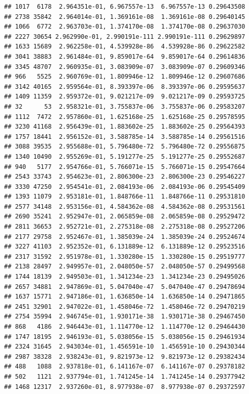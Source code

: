 \documentclass[
]{article}
\begin{document}
\begin{verbatim}
## 1017  6178  2.964351e-01, 6.967557e-13  6.967557e-13 0.29643508
## 2738 35842  2.964014e-01, 1.369161e-08  1.369161e-08 0.29640145
## 1066  6772  2.963703e-01, 1.374170e-08  1.374170e-08 0.29637030
## 2227 30654 2.962990e-01, 2.990191e-111 2.990191e-111 0.29629897
## 1633 15689  2.962258e-01, 4.539928e-86  4.539928e-86 0.29622582
## 3041 38883  2.961484e-01, 9.859017e-64  9.859017e-64 0.29614836
## 3345 48707  2.960935e-01, 3.083909e-07  3.083909e-07 0.29609346
## 966   5525  2.960769e-01, 1.809946e-12  1.809946e-12 0.29607686
## 3142 40165  2.959564e-01, 8.393397e-06  8.393397e-06 0.29595637
## 1409 11359  2.959372e-01, 9.021217e-09  9.021217e-09 0.29593725
## 32      53  2.958321e-01, 3.755837e-06  3.755837e-06 0.29583207
## 1112  7472  2.957860e-01, 1.625168e-25  1.625168e-25 0.29578595
## 3230 41168  2.956439e-01, 1.883602e-25  1.883602e-25 0.29564393
## 1757 18441  2.956152e-01, 3.588785e-14  3.588785e-14 0.29561516
## 3088 39535  2.955688e-01, 5.796480e-72  5.796480e-72 0.29556875
## 1340 10490  2.955269e-01, 5.191277e-25  5.191277e-25 0.29552687
## 940   5177  2.954766e-01, 5.766071e-15  5.766071e-15 0.29547664
## 2543 33743  2.954623e-01, 2.806300e-23  2.806300e-23 0.29546227
## 3330 47250  2.954541e-01, 2.084193e-06  2.084193e-06 0.29545409
## 1393 11079  2.953181e-01, 1.848766e-11  1.848766e-11 0.29531810
## 2577 34148  2.953156e-01, 4.584362e-08  4.584362e-08 0.29531561
## 2690 35241  2.952947e-01, 2.065859e-08  2.065859e-08 0.29529472
## 2811 36653  2.952721e-01, 2.275318e-08  2.275318e-08 0.29527206
## 2177 29758  2.952467e-01, 1.385039e-24  1.385039e-24 0.29524674
## 3227 41103  2.952352e-01, 6.131889e-12  6.131889e-12 0.29523516
## 2317 31592  2.951978e-01, 1.330280e-15  1.330280e-15 0.29519777
## 2138 28497  2.949957e-01, 2.048050e-57  2.048050e-57 0.29499568
## 1744 18139  2.949503e-01, 1.341234e-23  1.341234e-23 0.29495026
## 2657 34881  2.947869e-01, 5.047040e-47  5.047040e-47 0.29478694
## 1637 15771  2.947186e-01, 1.636850e-14  1.636850e-14 0.29471865
## 2451 32901  2.947022e-01, 1.458046e-72  1.458046e-72 0.29470219
## 2754 35994  2.946745e-01, 1.930171e-38  1.930171e-38 0.29467450
## 868   4186  2.946443e-01, 1.114770e-12  1.114770e-12 0.29464430
## 1747 18195  2.946193e-01, 5.038056e-15  5.038056e-15 0.29461934
## 2324 31645  2.943034e-01, 1.456591e-10  1.456591e-10 0.29430344
## 2987 38328  2.938243e-01, 9.821973e-12  9.821973e-12 0.29382434
## 488   1088  2.937818e-01, 6.141167e-07  6.141167e-07 0.29378182
## 502   1121  2.937794e-01, 1.741245e-14  1.741245e-14 0.29377942
## 1468 12317  2.937260e-01, 8.977938e-07  8.977938e-07 0.29372597

\end{verbatim}
\end{document}
